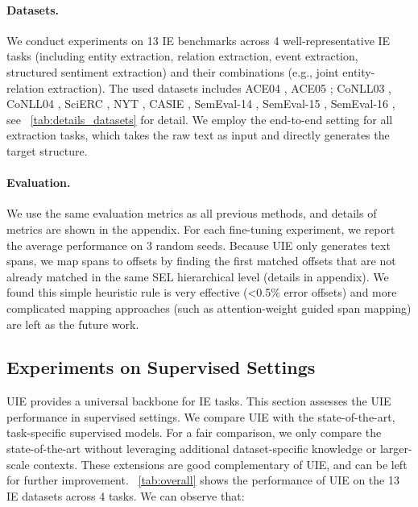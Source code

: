 \documentclass[11pt]{article}
\begin{document}
\paragraph{Datasets.}
We conduct experiments on 13 IE benchmarks across 4 well-representative IE tasks (including entity extraction, relation extraction, event extraction, structured sentiment extraction) and their combinations (e.g., joint entity-relation extraction).
The used datasets includes ACE04 \citep{ace2004-annotation}, ACE05 \citep{ace2005-annotation}; CoNLL03 \citep{tjongkimsang2003conll}, CoNLL04 \citep{roth-yih-2004-linear}, SciERC \citep{luan-etal-2018-multi}, NYT \citep{10.1007/978-3-642-15939-8_10}, CASIE \citep{Satyapanich_Ferraro_Finin_2020}, SemEval-14 \citep{pontiki-etal-2014-semeval}, SemEval-15 \citep{pontiki-etal-2015-semeval},
SemEval-16 \citep{pontiki-etal-2016-semeval}, see \tablename~\ref{tab:details_datasets} for detail.
We employ the end-to-end setting for all extraction tasks, which takes the raw text as input and directly generates the target structure.


\paragraph{Evaluation.}
We use the same evaluation metrics as all previous methods, and details of metrics are shown in the appendix.
For each fine-tuning experiment, we report the average performance on 3 random seeds.
Because UIE only generates text spans, we map spans to offsets by finding the first matched offsets that are not already matched in the same SEL hierarchical level (details in appendix).
We found this simple heuristic rule is very effective (<0.5\% error offsets) and more complicated mapping approaches (such as attention-weight guided span mapping) are left as the future work.

\subsection{Experiments on Supervised Settings}
UIE provides a universal backbone for IE tasks.
This section assesses the UIE performance in supervised settings.
We compare UIE with the state-of-the-art, task-specific supervised models.
For a fair comparison, we only compare the state-of-the-art without leveraging additional dataset-specific knowledge or larger-scale contexts.
These extensions are good complementary of UIE, and can be left for further improvement.
\tablename~\ref{tab:overall} shows the performance of UIE on the 13 IE datasets across 4 tasks.
We can observe that:
\end{document}
